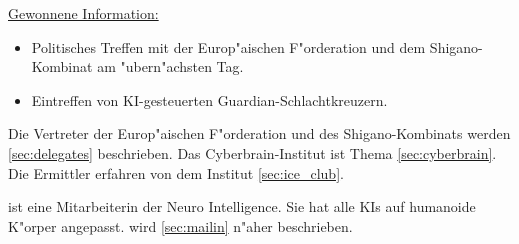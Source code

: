 \begin{remarks}
	\underline{Gewonnene Information:}
	
	\begin{itemize}
		\item Politisches Treffen mit der Europ"aischen F"orderation und dem Shigano-Kombinat am "ubern"achsten Tag.
		\item Eintreffen von KI-gesteuerten Guardian-Schlachtkreuzern.
	\end{itemize}

	Die Vertreter der Europ"aischen F"orderation und des Shigano-Kombinats werden \cref{sec:delegates} beschrieben.
	Das Cyberbrain-Institut ist Thema \cref{sec:cyberbrain}. Die Ermittler erfahren von dem Institut
	\cref{sec:ice_club}.

	\ml{} ist eine Mitarbeiterin der Neuro Intelligence. Sie hat alle KIs auf humanoide K"orper angepasst. \ml{} wird
	\cref{sec:mailin} n"aher beschrieben.
\end{remarks}
